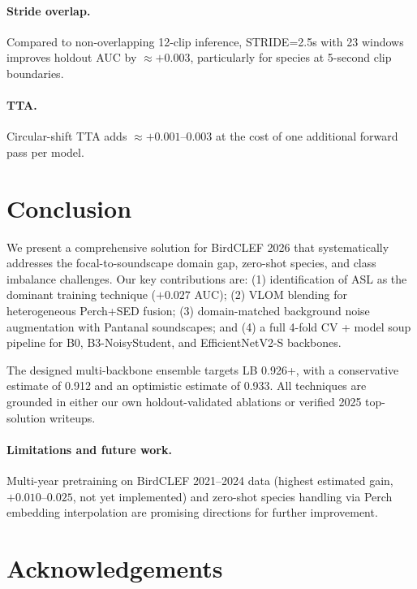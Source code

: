 \documentclass[10pt,twocolumn]{article}
\begin{document}
\paragraph{Stride overlap.}
Compared to non-overlapping 12-clip inference, STRIDE=2.5s with 23 windows
improves holdout AUC by $\approx+0.003$, particularly for species at
5-second clip boundaries.

\paragraph{TTA.}
Circular-shift TTA adds $\approx+0.001$--$0.003$ at the cost of one
additional forward pass per model.

\section{Conclusion}
\label{sec:conclusion}

We present a comprehensive solution for BirdCLEF 2026 that systematically
addresses the focal-to-soundscape domain gap, zero-shot species, and
class imbalance challenges.
Our key contributions are:
(1) identification of ASL as the dominant training technique ($+0.027$ AUC);
(2) VLOM blending for heterogeneous Perch+SED fusion;
(3) domain-matched background noise augmentation with Pantanal soundscapes;
and (4) a full 4-fold CV + model soup pipeline for B0, B3-NoisyStudent,
and EfficientNetV2-S backbones.

The designed multi-backbone ensemble targets LB 0.926+, with a conservative
estimate of 0.912 and an optimistic estimate of 0.933.
All techniques are grounded in either our own holdout-validated ablations
or verified 2025 top-solution writeups.

\paragraph{Limitations and future work.}
Multi-year pretraining on BirdCLEF 2021--2024 data (highest estimated gain,
$+0.010$--$0.025$, not yet implemented) and zero-shot species handling via
Perch embedding interpolation are promising directions for further improvement.

\section*{Acknowledgements}
\end{document}
